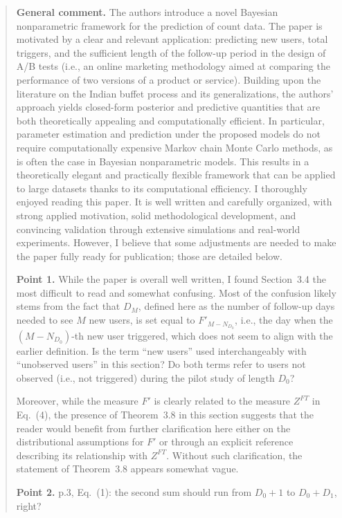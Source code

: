 \begin{quote}
\small
\textbf{General comment.}
The authors introduce a novel Bayesian nonparametric framework for
the prediction of count data. The paper is motivated by a clear and
relevant application: predicting new users, total triggers, and the
sufficient length of the follow-up period in the design of A/B tests
(i.e., an online marketing methodology aimed at comparing the
performance of two versions of a product or service). Building upon
the literature on the Indian buffet process and its generalizations,
the authors' approach yields closed-form posterior and predictive
quantities that are both theoretically appealing and computationally
efficient. In particular, parameter estimation and prediction under
the proposed models do not require computationally expensive Markov
chain Monte Carlo methods, as is often the case in Bayesian
nonparametric models. This results in a theoretically elegant and
practically flexible framework that can be applied to large datasets
thanks to its computational efficiency. I thoroughly enjoyed reading
this paper. It is well written and carefully organized, with strong
applied motivation, solid methodological development, and convincing
validation through extensive simulations and real-world experiments.
However, I believe that some adjustments are needed to make the paper
fully ready for publication; those are detailed below.

\medskip
\textbf{Point 1.}
While the paper is overall well written, I found Section~3.4 the most
difficult to read and somewhat confusing. Most of the confusion likely
stems from the fact that $D_M$, defined here as the number of
follow-up days needed to see $M$ new users, is set equal to
$F'_{M - N_{D_0}}$, i.e., the day when the $(M - N_{D_0})$-th new
user triggered, which does not seem to align with the earlier
definition. Is the term ``new users'' used interchangeably with
``unobserved users'' in this section? Do both terms refer to users
not observed (i.e., not triggered) during the pilot study of length
$D_0$?

Moreover, while the measure $F'$ is clearly related to the measure
$Z^{FT}$ in Eq.~(4), the presence of Theorem~3.8 in this section
suggests that the reader would benefit from further clarification
here either on the distributional assumptions for $F'$ or through an
explicit reference describing its relationship with $Z^{FT}$.
Without such clarification, the statement of Theorem~3.8 appears
somewhat vague.

\medskip
\textbf{Point 2.}
p.3, Eq.~(1): the second sum should run from $D_0 + 1$ to
$D_0 + D_1$, right?


\end{quote}
